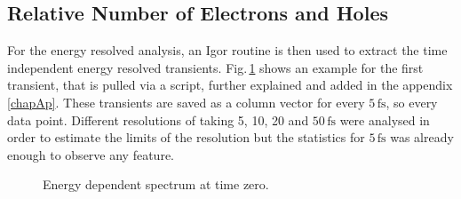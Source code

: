 \documentclass[a4paper,12pt,twoside]{article}
\begin{document}
\subsection{Relative Number of Electrons and Holes}
    \label{chapRNEH}
For the energy resolved analysis, an Igor routine is then used to extract the time independent energy resolved transients. Fig.\,\ref{timedep2} shows an example for the first transient, that is pulled via a script, further explained and added in the appendix \ref{chapAp}. These transients are saved as a column vector for every $5\,\mathrm{fs}$, so every data point. Different resolutions of taking 5, 10, 20 and $ 50\,\mathrm{fs}$ were analysed in order to estimate the limits of the resolution but the statistics for $5\,\mathrm{fs}$ was already enough to observe any feature.


		\begin{figure}[H]
		\caption{Energy dependent spectrum at time zero.}
	    	\label{timedep2}
	\end{figure}
\end{document}
